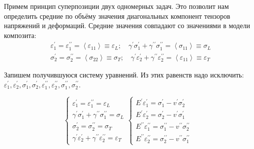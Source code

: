 Примем принцип суперпозиции двух одномерных задач. Это позволит нам определить средние по объёму значения диагональных компонент тензоров напряжений и деформаций. Средние значения совпадают со значениями в модели композита:
$$
\begin{aligned}
& \varepsilon_1^{\prime}=\varepsilon_1^{\prime \prime}=\left\langle\varepsilon_{11}\right\rangle \equiv \varepsilon_L ; \quad \gamma^{\prime} \sigma_1^{\prime}+\gamma^{\prime \prime} \sigma_1^{\prime \prime}=\left\langle\sigma_{11}\right\rangle \equiv \sigma_L \\
& \sigma_2^{\prime}=\sigma_2^{\prime \prime}=\left\langle\sigma_{22}\right\rangle \equiv \sigma_T ; \quad \gamma^{\prime} \varepsilon_2^{\prime}+\gamma^{\prime \prime} \varepsilon_2^{\prime \prime}=\left\langle\varepsilon_{11}\right\rangle \equiv \varepsilon_T
\end{aligned}
$$

Запишем получившуюся систему уравнений. Из этих равенств надо исключить: $\varepsilon_1^{\prime}, \varepsilon_2^{\prime}, \sigma_1^{\prime}, \sigma_2^{\prime}, \varepsilon_1^{\prime \prime}, \varepsilon_2^{\prime \prime}, \sigma_1^{\prime \prime}, \sigma_2^{\prime \prime}$.

$$\left\{\begin{array} { l } 
{ \varepsilon _ { 1 } ^ { \prime } = \varepsilon _ { 1 } ^ { \prime \prime } = \varepsilon _ { L } } \\
{ \gamma ^ { \prime } \sigma _ { 1 } ^ { \prime } + \gamma ^ { \prime \prime } \sigma _ { 1 } ^ { \prime \prime } = \sigma _ { L } } \\
{ \sigma _ { 2 } ^ { \prime } = \sigma _ { 2 } ^ { \prime \prime } = \sigma _ { T } } \\
{ \gamma ^ { \prime } \varepsilon _ { 2 } ^ { \prime } + \gamma ^ { \prime \prime } \varepsilon _ { 2 } ^ { \prime \prime } = \varepsilon _ { T } }
\end{array} \left\{\begin{array}{l}
E^{\prime} \varepsilon_1^{\prime}=\sigma_1^{\prime}-v^{\prime} \sigma_2^{\prime} \\
E^{\prime} \varepsilon_2^{\prime}=\sigma_2^{\prime}-v^{\prime} \sigma_1^{\prime} \\
E^{\prime \prime} \varepsilon_1^{\prime \prime}=\sigma_1^{\prime \prime}-v^{\prime \prime} \sigma_2^{\prime \prime} \\
E^{\prime \prime} \varepsilon_2^{\prime \prime}=\sigma_2^{\prime \prime}-v^{\prime \prime} \sigma_1^{\prime \prime}
\end{array}\right.\right.$$

